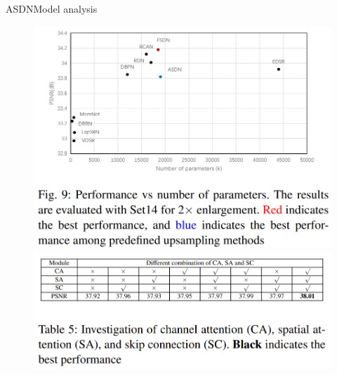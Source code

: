 \documentclass[
    xcolor={svgnames},
    hyperref={colorlinks,citecolor=OrangeRed,linkcolor=OrangeRed,urlcolor=DarkBlue}
    ]{beamer}
\begin{document}
\begin{frame}{ASDN}{Model analysis}
    \begin{figure}
        \centering
        \includegraphics[height=0.5\textheight,keepaspectratio]{asdn-psnr-n_params.png}
        \vspace*{100px}
        \includegraphics[height=0.5\textheight,keepaspectratio]{asdn-ablation-study.png}
    \end{figure}
\end{frame}
\end{document}
